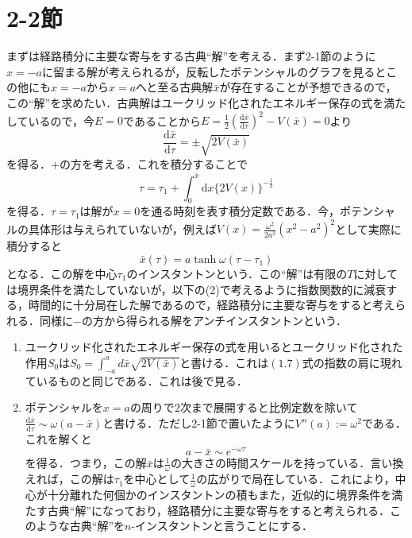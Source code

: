 \documentclass[a4paper,11pt]{jsarticle}
\begin{document}
\section*{2-2節}
まずは経路積分に主要な寄与をする古典``解''を考える．まず2-1節のように$x=-a$に留まる解が考えられるが，反転したポテンシャルのグラフを見るとこの他にも$x=-a$から$x=a$へと至る古典解$\bar{x}$が存在することが予想できるので，この``解''を求めたい．古典解はユークリッド化されたエネルギー保存の式を満たしているので，今$E=0$であることから$E=\frac{1}{2}\left(\frac{\mathrm{d}\bar{x}}{\mathrm{d}\tau}\right)^2-V(\bar{x})=0$より
\begin{equation*}
\frac{\mathrm{d}\bar{x}}{\mathrm{d}\tau}=\pm\sqrt{2V(\bar{x})}
\end{equation*}
を得る．$+$の方を考える．これを積分することで
\begin{equation*}
\tau=\tau_1+\int_0^{\bar{x}}\mathrm{d}x\{2V(x)\}^{-\frac{1}{2}}
\end{equation*}
を得る．$\tau=\tau_1$は解が$x=0$を通る時刻を表す積分定数である．今，ポテンシャルの具体形は与えられていないが，例えば$V(x)=\frac{\omega^2}{2a^2}(x^2-a^2)^2$として実際に積分すると
\begin{equation*}
\bar{x}(\tau)=a\tanh{\omega(\tau-\tau_1)}
\end{equation*}
となる．この解を中心$\tau_1$のインスタントンという．この``解''は有限の$T$に対しては境界条件を満たしていないが，以下の(2)で考えるように指数関数的に減衰する，時間的に十分局在した解であるので，経路積分に主要な寄与をすると考えられる．同様に$-$の方から得られる解をアンチインスタントンという．
\begin{enumerate}
\renewcommand{\labelenumi}{(\arabic{enumi})}
\item ユークリッド化されたエネルギー保存の式を用いるとユークリッド化された作用$S_0$は$S_0=\int_{-a}^a d\bar{x}\sqrt{2V(\bar{x})}$と書ける．これは$(1.7)$式の指数の肩に現れているものと同じである．これは後で見る．
\item ポテンシャルを$x=a$の周りで$2$次まで展開すると比例定数を除いて$\frac{\mathrm{d}\bar{x}}{\mathrm{d}\tau}\sim\omega(a-\bar{x})$と書ける．ただし2-1節で置いたように$V''(a):=\omega^2$である．これを解くと
\begin{equation*}
a-\bar{x}\sim e^{-\omega\tau}
\end{equation*}
を得る．つまり，この解$\bar{x}$は$\frac{1}{\omega}$の大きさの時間スケールを持っている．言い換えれば，この解は$\tau_1$を中心として$\frac{1}{\omega}$の広がりで局在している．これにより，中心が十分離れた何個かのインスタントンの積もまた，近似的に境界条件を満たす古典``解''になっており，経路積分に主要な寄与をすると考えられる．このような古典``解''を$n$-インスタントンと言うことにする．
\end{enumerate}
\end{document}
